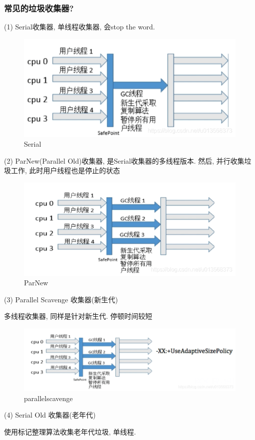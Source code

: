 \subsubsection{常见的垃圾收集器?}
(1) Serial收集器, 单线程收集器, 会stop the word. \par
\begin{figure}
	\centering
	\includegraphics[width=0.7\linewidth]{figures/Serial.png}
	\caption{Serial}
	\label{fig:Serial}
\end{figure}
(2) ParNew(Parallel Old)收集器, 是Serial收集器的多线程版本. 然后, 并行收集垃圾工作, 此时用户线程也是停止的状态 \par
\begin{figure}
	\centering
	\includegraphics[width=0.7\linewidth]{figures/ParNew.png}
	\caption{ParNew}
	\label{fig:ParNew}
\end{figure}
(3) Parallel Scavenge 收集器(新生代) \par
多线程收集器, 同样是针对新生代. 停顿时间较短 \par
\begin{figure}
	\centering
	\includegraphics[width=0.7\linewidth]{figures/parallelscavenge.png}
	\caption{parallelscavenge}
	\label{fig:parallelscavenge}
\end{figure}
(4) Serial Old 收集器(老年代) \par
使用标记整理算法收集老年代垃圾, 单线程. \par
